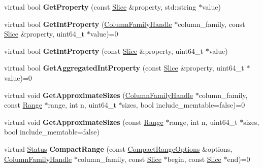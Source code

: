 \begin{DoxyCompactItemize}
\item 
virtual bool {\bfseries Get\+Property} (const \hyperlink{classrocksdb_1_1Slice}{Slice} \&property, std\+::string $\ast$value)\hypertarget{classrocksdb_1_1DB_a579863b12d9adff0cb560218846c9b1f}{}\label{classrocksdb_1_1DB_a579863b12d9adff0cb560218846c9b1f}

\item 
virtual bool {\bfseries Get\+Int\+Property} (\hyperlink{classrocksdb_1_1ColumnFamilyHandle}{Column\+Family\+Handle} $\ast$column\+\_\+family, const \hyperlink{classrocksdb_1_1Slice}{Slice} \&property, uint64\+\_\+t $\ast$value)=0\hypertarget{classrocksdb_1_1DB_a76b06e26e9c0436b26034f826bfda8c0}{}\label{classrocksdb_1_1DB_a76b06e26e9c0436b26034f826bfda8c0}

\item 
virtual bool {\bfseries Get\+Int\+Property} (const \hyperlink{classrocksdb_1_1Slice}{Slice} \&property, uint64\+\_\+t $\ast$value)\hypertarget{classrocksdb_1_1DB_a0e8ae1d11f99d95db4d6e270674a9f7b}{}\label{classrocksdb_1_1DB_a0e8ae1d11f99d95db4d6e270674a9f7b}

\item 
virtual bool {\bfseries Get\+Aggregated\+Int\+Property} (const \hyperlink{classrocksdb_1_1Slice}{Slice} \&property, uint64\+\_\+t $\ast$value)=0\hypertarget{classrocksdb_1_1DB_a27ffb63934a6b2e1fdae25667f551f76}{}\label{classrocksdb_1_1DB_a27ffb63934a6b2e1fdae25667f551f76}

\item 
virtual void {\bfseries Get\+Approximate\+Sizes} (\hyperlink{classrocksdb_1_1ColumnFamilyHandle}{Column\+Family\+Handle} $\ast$column\+\_\+family, const \hyperlink{structrocksdb_1_1Range}{Range} $\ast$range, int n, uint64\+\_\+t $\ast$sizes, bool include\+\_\+memtable=false)=0\hypertarget{classrocksdb_1_1DB_a3f135e62b87497858d3abcff25b651ce}{}\label{classrocksdb_1_1DB_a3f135e62b87497858d3abcff25b651ce}

\item 
virtual void {\bfseries Get\+Approximate\+Sizes} (const \hyperlink{structrocksdb_1_1Range}{Range} $\ast$range, int n, uint64\+\_\+t $\ast$sizes, bool include\+\_\+memtable=false)\hypertarget{classrocksdb_1_1DB_a0d06bfb3ff0c90a650d1c2bb4926e6ce}{}\label{classrocksdb_1_1DB_a0d06bfb3ff0c90a650d1c2bb4926e6ce}

\item 
virtual \hyperlink{classrocksdb_1_1Status}{Status} {\bfseries Compact\+Range} (const \hyperlink{structrocksdb_1_1CompactRangeOptions}{Compact\+Range\+Options} \&options, \hyperlink{classrocksdb_1_1ColumnFamilyHandle}{Column\+Family\+Handle} $\ast$column\+\_\+family, const \hyperlink{classrocksdb_1_1Slice}{Slice} $\ast$begin, const \hyperlink{classrocksdb_1_1Slice}{Slice} $\ast$end)=0\hypertarget{classrocksdb_1_1DB_a83ca9b10138335cd4fddadd65c748882}{}\label{classrocksdb_1_1DB_a83ca9b10138335cd4fddadd65c748882}


\end{DoxyCompactItemize}
